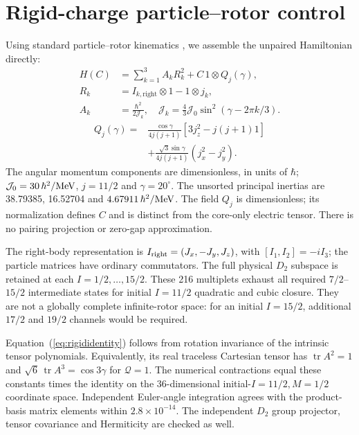 \section{Rigid-charge particle--rotor control}\label{app:rigid}

Using standard particle--rotor kinematics \cite{BohrMottelson1975},
we assemble the unpaired Hamiltonian directly:
\begin{align}
H(C)&=\sum_{k=1}^3 A_k R_k^2+C\,1\otimes Q_j(\gamma),\\
R_k&=I_{k,\mathrm{right}}\otimes1-1\otimes j_k,\nonumber\\
A_k&=\frac{\hbar^2}{2\mathcal J_k},\quad
\mathcal J_k=\frac43\mathcal J_0\sin^2(\gamma-2\pi k/3).
\end{align}
\begin{equation}
\begin{aligned}
Q_j(\gamma)={}&\frac{\cos\gamma}{4j(j+1)}[3j_z^2-j(j+1)1]\\
&+\frac{\sqrt3\sin\gamma}{4j(j+1)}(j_x^2-j_y^2).
\end{aligned}
\end{equation}
The angular momentum components are dimensionless, in units of $\hbar$;
$\mathcal J_0=30\,\hbar^2/{\rm MeV}$, $j=11/2$ and
$\gamma=20^\circ$. The unsorted principal inertias are
38.79385, 16.52704 and $4.67911\,\hbar^2/{\rm MeV}$.
The field $Q_j$ is dimensionless; its normalization defines $C$ and
is distinct from the core-only electric tensor.
There is no pairing projection or zero-gap approximation.

The right-body representation is
$I_{\rm right}=(J_x,-J_y,J_z)$, with
$[I_1,I_2]=-iI_3$; the particle matrices have ordinary commutators.
The full physical $D_2$ subspace is retained at each
$I=1/2,\ldots,15/2$. These 216 multiplets exhaust all required
$7/2$--$15/2$ intermediate states for initial $I=11/2$ quadratic
and cubic closure. They are not a globally complete infinite-rotor space:
for an initial $I=15/2$, additional $17/2$ and $19/2$ channels would be required.

Equation~(\ref{eq:rigididentity}) follows from rotation invariance of
the intrinsic tensor polynomials. Equivalently, its real traceless
Cartesian tensor has
$\operatorname{tr}A^2=1$ and
$\sqrt6\,\operatorname{tr}A^3=\cos3\gamma$ for $\mathcal Q=1$.
The numerical contractions equal these constants times the identity
on the 36-dimensional initial-$I=11/2,M=1/2$ coordinate space.
Independent Euler-angle integration agrees with the product-basis
matrix elements within $2.8\times10^{-14}$.
The independent $D_2$ group projector, tensor covariance and Hermiticity
are checked as well.

